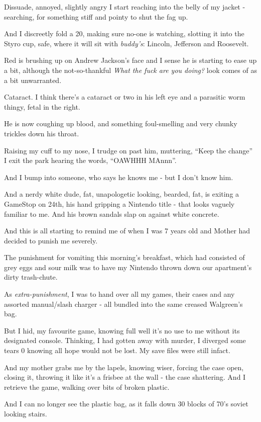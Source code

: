 \documentclass[19pt,openany]{book}
\begin{document}
Dissuade, annoyed, slightly
angry I start reaching into the belly of my
jacket - searching, for something
stiff and pointy to shut the
fag up.

And I discreetly fold a 20,
making sure no-one is watching,
slotting it into the Styro cup,
safe, where it will sit with
\textit{buddy's}: Lincoln,
Jefferson and Roosevelt.

Red is brushing up on Andrew
Jackson's face and I sense
he is starting to ease up a bit,
although the not-so-thankful
\textit{What the fuck are you doing?}
look comes of as a bit unwarranted.

Cataract. I think there's a cataract
or two in his left eye and a parasitic
worm thingy, fetal in the right.

He is now coughing up blood, and
something foul-smelling
and very chunky trickles down his
throat.

Raising my cuff to my nose, I trudge
on past him, muttering,
``Keep the change'' I exit the park hearing
the words, ``OAWHHH MAnnn''.

And I bump into someone,
who says he knows me - but
I don't know him.

And a nerdy white dude,
fat, unapologetic looking,
bearded, fat, is exiting
a GameStop on 24th, his
hand gripping a Nintendo
title - that looks vaguely
familiar to me. And his brown
sandals slap on against
white concrete.

And this is
all starting to remind
me of when I was 7 years
old and Mother had decided
to punish me severely.

The punishment for
vomiting this morning's
breakfast, which had
consisted of grey eggs
and sour milk was to have
my Nintendo thrown down
our apartment's dirty trash-chute.

As \textit{extra-punishment},
I was to hand over all
my games, their cases
and any assorted manual/slash
charger - all bundled into
the same creased Walgreen's
bag.

But I hid, my favourite game,
knowing full well
it's no use to me without
its designated console.
Thinking, I had gotten
away with murder, I diverged
some tears 0 knowing all hope
would not be lost. My save
files were still infact.

And my mother grabs me by the lapels,
knowing wiser, forcing the case open,
closing it, throwing it like it's
a frisbee at the wall - the case
shattering. And I retrieve the game,
walking over bits of broken plastic.

And I can no longer see the
plastic bag, as it falls
down 30 blocks of 70's soviet
looking stairs.
\end{document}
